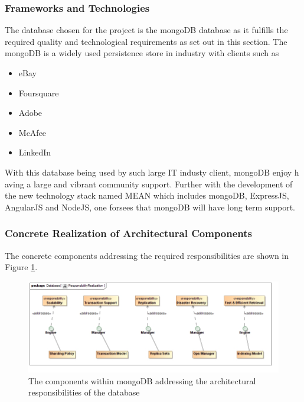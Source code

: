 \subsubsection{Frameworks and Technologies}
The database chosen for the project is the mongoDB database as it fulfills the
required quality and technological requirements as set out in this section. The
mongoDB is a widely used persistence store in industry with clients such as
\begin{itemize}
	\item eBay
	\item Foursquare
	\item Adobe
	\item McAfee
	\item LinkedIn
\end{itemize}

With this database being used by such large IT industy client, mongoDB enjoy h
aving a large and vibrant community support. Further with the development of
the new technology stack named MEAN which includes mongoDB, ExpressJS, AngularJS
and NodeJS, one forsees that mongoDB will have long term support.

\subsubsection{Concrete Realization of Architectural Components}
The concrete components addressing the required responsibilities are shown in Figure \ref{fig:databaseResponsibilityRealization}.
\begin{figure}[H]
	\begin{center}
	\includegraphics[scale=0.5]{../Diagrams and Charts/Database/ResponsibilityRealization.jpg}
	\caption{The components within mongoDB addressing the architectural responsibilities of the database}
	\label{fig:databaseResponsibilityRealization}
	\end{center}
\end{figure}